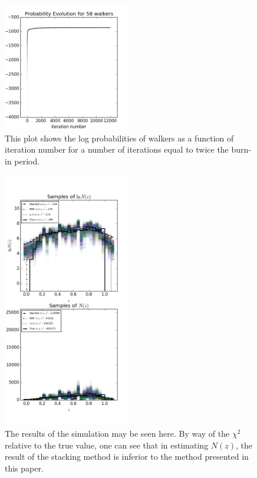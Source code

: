 \documentclass[preprint]{aastex}
\begin{document}
\begin{figure}
\includegraphics[width=0.5\textwidth]{probs-real.png}
\caption{This plot shows the log probabilities of walkers as a function of iteration number for a number of iterations equal to twice the burn-in period.}
\label{fig:realprob}
\end{figure}

\begin{figure}
\includegraphics[width=0.5\textwidth]{samps-real.png}
\caption{The results of the simulation may be seen here.  By way of the $\chi^{2}$ relative to the true value, one can see that in estimating $N(z)$, the result of the stacking method is inferior to the method presented in this paper.}
\label{fig:realparam}
\end{figure}
\end{document}
